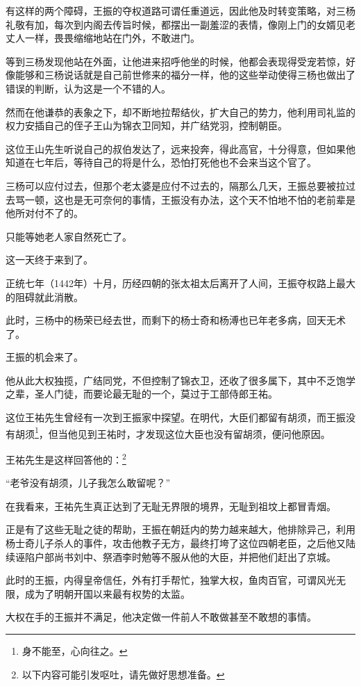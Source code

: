 \begin{multicols}{\theparacolNo}
有这样的两个障碍，王振的夺权道路可谓任重道远，因此他及时转变策略，对三杨礼敬有加，每次到内阁去传旨时候，都摆出一副羞涩的表情，像刚上门的女婿见老丈人一样，畏畏缩缩地站在门外，不敢进门。

等到三杨发现他站在外面，让他进来招呼他坐的时候，他都会表现得受宠若惊，好像能够和三杨说话就是自己前世修来的福分一样，他的这些举动使得三杨也做出了错误的判断，认为这是一个不错的人。

然而在他谦恭的表象之下，却不断地拉帮结伙，扩大自己的势力，他利用司礼监的权力安插自己的侄子王山为锦衣卫同知，并广结党羽，控制朝臣。

这位王山先生听说自己的叔伯发达了，远来投奔，得此高官，十分得意，但如果他知道在七年后，等待自己的将是什么，恐怕打死他也不会来当这个官了。

三杨可以应付过去，但那个老太婆是应付不过去的，隔那么几天，王振总要被拉过去骂一顿，这也是无可奈何的事情，王振没有办法，这个天不怕地不怕的老前辈是他所对付不了的。

只能等她老人家自然死亡了。

这一天终于来到了。

正统七年（1442年）十月，历经四朝的张太祖太后离开了人间，王振夺权路上最大的阻碍就此消散。

此时，三杨中的杨荣已经去世，而剩下的杨士奇和杨溥也已年老多病，回天无术了。

王振的机会来了。

他从此大权独揽，广结同党，不但控制了锦衣卫，还收了很多属下，其中不乏饱学之辈，圣人门徒，而要论最无耻的一个，莫过于工部侍郎王祐。

这位王祐先生曾经有一次到王振家中探望。在明代，大臣们都留有胡须，而王振没有胡须\footnote{身不能至，心向往之。}，但当他见到王祐时，才发现这位大臣也没有留胡须，便问他原因。

王祐先生是这样回答他的：\footnote{以下内容可能引发呕吐，请先做好思想准备。}

“老爷没有胡须，儿子我怎么敢留呢？”

在我看来，王祐先生真正达到了无耻无界限的境界，无耻到祖坟上都冒青烟。

正是有了这些无耻之徒的帮助，王振在朝廷内的势力越来越大，他排除异己，利用杨士奇儿子杀人的事件，攻击他教子无方，最终打垮了这位四朝老臣，之后他又陆续诬陷户部尚书刘中、祭酒李时勉等不服从他的大臣，并把他们赶出了京城。

此时的王振，内得皇帝信任，外有打手帮忙，独掌大权，鱼肉百官，可谓风光无限，成为了明朝开国以来最有权势的太监。

大权在手的王振并不满足，他决定做一件前人不敢做甚至不敢想的事情。


\end{multicols}
